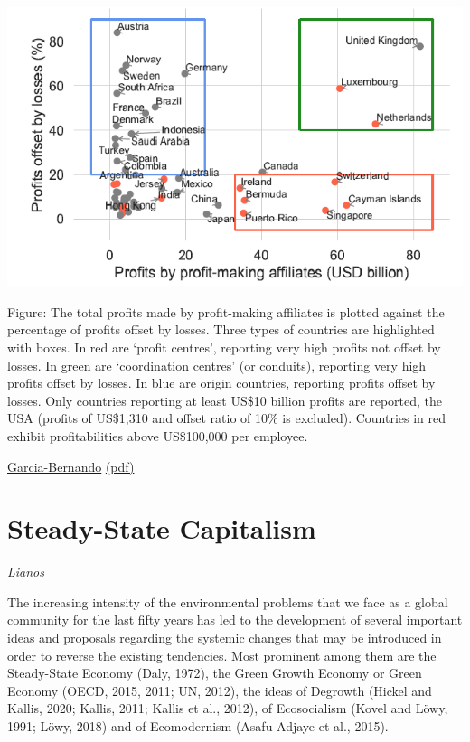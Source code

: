 \documentclass[
]{book}
\begin{document}
\includegraphics{fig/profit_shifting.png}

Figure: The total profits made by profit-making affiliates is plotted
against the percentage of profits offset by losses.
Three types of countries are highlighted with boxes.
In red are `profit centres', reporting very high profits not offset by losses.
In green are `coordination centres' (or conduits),
reporting very high profits offset by losses.
In blue are origin countries, reporting profits offset by losses.
Only countries reporting at least US\$10 billion profits are reported,
the USA (profits of US\$1,310 and offset ratio of 10\% is excluded).
Countries in red exhibit profitabilities above US\$100,000 per employee.

\href{https://www.ictd.ac/publication/profit-shifting-multinational-corporations-worldwide/}{Garcia-Bernando}
\href{pdf/Garcia_Bernando_2020_Profit-shifting.pdf}{(pdf)}

\hypertarget{steady-state-capitalism}{%
\section{Steady-State Capitalism}\label{steady-state-capitalism}}

\emph{Lianos}

The increasing intensity of the environmental problems that we face as a global community
for the last fifty years has led to the development of several important ideas and proposals
regarding the systemic changes that may be introduced in order to reverse the existing
tendencies. Most prominent among them are the Steady-State Economy (Daly, 1972), the
Green Growth Economy or Green Economy (OECD, 2015, 2011; UN, 2012), the ideas of
Degrowth (Hickel and Kallis, 2020; Kallis, 2011; Kallis et al., 2012), of Ecosocialism (Kovel
and Löwy, 1991; Löwy, 2018) and of Ecomodernism (Asafu-Adjaye et al., 2015).
\end{document}
